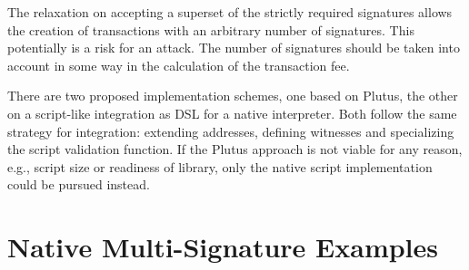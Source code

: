 \documentclass[11pt,a4paper,dvipsnames]{article}
\theoremstyle{definition}
\begin{document}
The relaxation on accepting a superset of the strictly required signatures
allows the creation of transactions with an arbitrary number of signatures. This
potentially is a risk for an attack. The number of signatures should be taken
into account in some way in the calculation of the transaction fee.

There are two proposed implementation schemes, one based on Plutus, the other on
a script-like integration as DSL for a native interpreter. Both follow the same
strategy for integration: extending addresses, defining witnesses and
specializing the script validation function. If the Plutus approach is not
viable for any reason, e.g., script size or readiness of library, only the
native script implementation could be pursued instead.

\appendix

\section{Native Multi-Signature Examples}
\label{sec:native-multi-sign}
\end{document}

